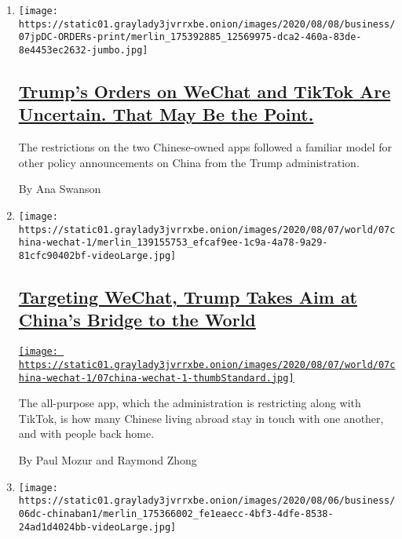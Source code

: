 \begin{enumerate}
\def\labelenumi{\arabic{enumi}.}
\item
  \texttt{[image: https://static01.graylady3jvrrxbe.onion/images/2020/08/08/business/07jpDC-ORDERs-print/merlin\_175392885\_12569975-dca2-460a-83de-8e4453ec2632-jumbo.jpg]}

  \hypertarget{trumps-orders-on-wechat-and-tiktok-are-uncertain-that-may-be-the-point}{%
  \subsection{\texorpdfstring{\href{/2020/08/07/business/economy/trump-executive-order-tiktok-wechat.html}{Trump's
  Orders on WeChat and TikTok Are Uncertain. That May Be the
  Point.}}{Trump's Orders on WeChat and TikTok Are Uncertain. That May Be the Point.}}\label{trumps-orders-on-wechat-and-tiktok-are-uncertain-that-may-be-the-point}}

  The restrictions on the two Chinese-owned apps followed a familiar
  model for other policy announcements on China from the Trump
  administration.

  By Ana Swanson
\item
  \texttt{[image: https://static01.graylady3jvrrxbe.onion/images/2020/08/07/world/07china-wechat-1/merlin\_139155753\_efcaf9ee-1c9a-4a78-9a29-81cfc90402bf-videoLarge.jpg]}

  \hypertarget{targeting-wechat-trump-takes-aim-at-chinas-bridge-to-the-world}{%
  \subsection{\texorpdfstring{\href{/2020/08/07/business/trump-china-wechat-tiktok.html}{Targeting
  WeChat, Trump Takes Aim at China's Bridge to the
  World}}{Targeting WeChat, Trump Takes Aim at China's Bridge to the World}}\label{targeting-wechat-trump-takes-aim-at-chinas-bridge-to-the-world}}

  \href{/2020/08/07/business/trump-china-wechat-tiktok.html}{\texttt{[image: https://static01.graylady3jvrrxbe.onion/images/2020/08/07/world/07china-wechat-1/07china-wechat-1-thumbStandard.jpg]}}

  The all-purpose app, which the administration is restricting along
  with TikTok, is how many Chinese living abroad stay in touch with one
  another, and with people back home.

  By Paul Mozur and Raymond Zhong
\item
  \texttt{[image: https://static01.graylady3jvrrxbe.onion/images/2020/08/06/business/06dc-chinaban1/merlin\_175366002\_fe1eaecc-4bf3-4dfe-8538-24ad1d4024bb-videoLarge.jpg]}


\end{enumerate}
